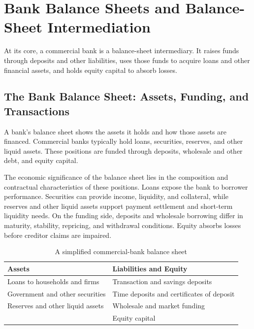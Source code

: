 \section{Bank Balance Sheets and Balance-Sheet Intermediation}

At its core, a commercial bank is a balance-sheet intermediary. It raises funds through deposits and other liabilities, uses those funds to acquire loans and other financial assets, and holds equity capital to absorb losses.

\subsection{The Bank Balance Sheet: Assets, Funding, and Transactions}

A bank's balance sheet shows the assets it holds and how those assets are financed. Commercial banks typically hold loans, securities, reserves, and other liquid assets. These positions are funded through deposits, wholesale and other debt, and equity capital.

The economic significance of the balance sheet lies in the composition and contractual characteristics of these positions. Loans expose the bank to borrower performance. Securities can provide income, liquidity, and collateral, while reserves and other liquid assets support payment settlement and short-term liquidity needs. On the funding side, deposits and wholesale borrowing differ in maturity, stability, repricing, and withdrawal conditions. Equity absorbs losses before creditor claims are impaired.

\begin{table}[H]

\centering

\caption{A simplified commercial-bank balance sheet}

\label{tab:ch12-simplified-bank-balance-sheet}

\begin{tabularx}{0.82\textwidth}{@{}X X@{}}

\toprule

\textbf{Assets} & \textbf{Liabilities and Equity} \\

\midrule

Loans to households and firms & Transaction and savings deposits \\

Government and other securities & Time deposits and certificates of deposit \\

Reserves and other liquid assets & Wholesale and market funding \\

& Equity capital \\

\bottomrule

\end{tabularx}

\end{table}

